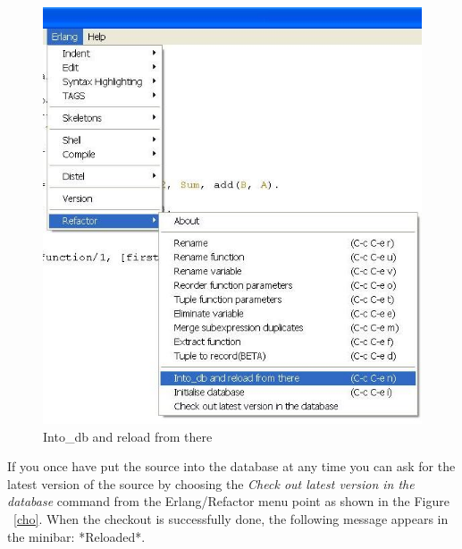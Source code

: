 \documentclass[12pt]{article}
\begin{document}
\begin{center}
\begin{figure}[htbp]

    \includegraphics[scale=0.80]{load.jpg}
   \caption{Into\_db and reload from there}
  \label{load}
\end{figure}
\end{center}

If you once have put the source into the database at any time you can ask for the latest version of the source by 
choosing the {\it Check out latest version in the database} command from the Erlang/Refactor menu point as shown in the Figure ~\ref{cho}.
When the checkout is successfully done, the following message appears in the minibar: *Reloaded*. 
\end{document}
